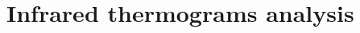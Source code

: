 \pagestyle{standard}

\chapter{Infrared thermograms analysis}

	\thispagestyle{chapter-first-page}

	
	